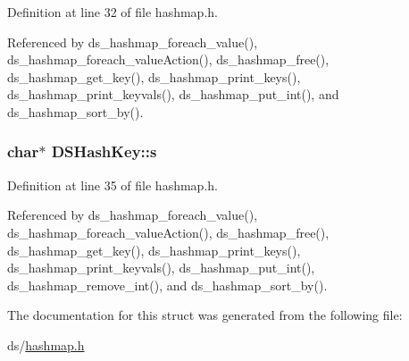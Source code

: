 Definition at line 32 of file hashmap.\+h.



Referenced by ds\+\_\+hashmap\+\_\+foreach\+\_\+value(), ds\+\_\+hashmap\+\_\+foreach\+\_\+value\+Action(), ds\+\_\+hashmap\+\_\+free(), ds\+\_\+hashmap\+\_\+get\+\_\+key(), ds\+\_\+hashmap\+\_\+print\+\_\+keys(), ds\+\_\+hashmap\+\_\+print\+\_\+keyvals(), ds\+\_\+hashmap\+\_\+put\+\_\+int(), and ds\+\_\+hashmap\+\_\+sort\+\_\+by().

\subsubsection[{\texorpdfstring{s}{s}}]{\setlength{\rightskip}{0pt plus 5cm}char$\ast$ D\+S\+Hash\+Key\+::s}\hypertarget{structDSHashKey_a769b7d9bdd742b820246da81976265fc}{}\label{structDSHashKey_a769b7d9bdd742b820246da81976265fc}


Definition at line 35 of file hashmap.\+h.



Referenced by ds\+\_\+hashmap\+\_\+foreach\+\_\+value(), ds\+\_\+hashmap\+\_\+foreach\+\_\+value\+Action(), ds\+\_\+hashmap\+\_\+free(), ds\+\_\+hashmap\+\_\+get\+\_\+key(), ds\+\_\+hashmap\+\_\+print\+\_\+keys(), ds\+\_\+hashmap\+\_\+print\+\_\+keyvals(), ds\+\_\+hashmap\+\_\+put\+\_\+int(), ds\+\_\+hashmap\+\_\+remove\+\_\+int(), and ds\+\_\+hashmap\+\_\+sort\+\_\+by().



The documentation for this struct was generated from the following file\+:\begin{DoxyCompactItemize}
\item 
ds/\hyperlink{hashmap_8h}{hashmap.\+h}\end{DoxyCompactItemize}
